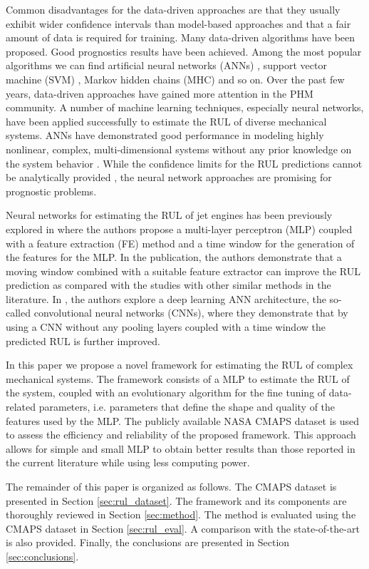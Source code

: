 \documentclass[12pt]{IEEEtran}%
\begin{document}
Common disadvantages for the data-driven approaches are that they usually
exhibit wider confidence intervals than model-based approaches and that a fair
amount of data is required for training. Many data-driven algorithms have been
proposed. Good prognostics results have been achieved. Among the most popular
algorithms we can find artificial neural networks (ANNs) \cite{Gebraeel2004},
support vector machine (SVM) \cite{Benkedjouh2013}, Markov hidden chains (MHC)
\cite{Dong2007} and so on. Over the past few years, data-driven approaches
have gained more attention in the PHM community. A number of machine learning
techniques, especially neural networks, have been applied successfully to
estimate the RUL of diverse mechanical systems. ANNs have demonstrated good
performance in modeling highly nonlinear, complex, multi-dimensional systems
without any prior knowledge on the system behavior \cite{Li2018}. While the
confidence limits for the RUL predictions cannot be analytically provided
\cite{Sikorska2011}, the neural network approaches are promising for
prognostic problems.

Neural networks for estimating the RUL of jet engines has been previously
explored in \cite{Lim2016} where the authors propose a multi-layer perceptron
(MLP) coupled with a feature extraction (FE) method and a time window for the
generation of the features for the MLP. In the publication, the authors
demonstrate that a moving window combined with a suitable feature extractor
can improve the RUL prediction as compared with the studies with other similar
methods in the literature. In \cite{Li2018}, the authors explore a deep
learning ANN architecture, the so-called convolutional neural networks (CNNs),
where they demonstrate that by using a CNN without any pooling layers coupled
with a time window the predicted RUL is further improved.

In this paper we propose a novel framework for estimating the RUL of complex
mechanical systems. The framework consists of a MLP to estimate the RUL of the
system, coupled with an evolutionary algorithm for the fine tuning of
data-related parameters, i.e. parameters that define the shape and quality of
the features used by the MLP. The publicly available NASA CMAPS dataset
\cite{CMAPS2008} is used to assess the efficiency and reliability of the
proposed framework. This approach allows for simple and small MLP to obtain
better results than those reported in the current literature while using less
computing power.

The remainder of this paper is organized as follows. The CMAPS dataset is
presented in Section \ref{sec:rul_dataset}. The framework and its components
are thoroughly reviewed in Section \ref{sec:method}. The method is evaluated
using the CMAPS dataset in Section \ref{sec:rul_eval}. A comparison with the
state-of-the-art is also provided. Finally, the conclusions are presented in
Section \ref{sec:conclusions}.
\end{document}
